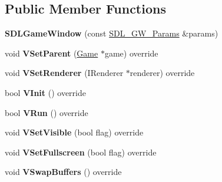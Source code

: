 \subsection*{Public Member Functions}
\begin{DoxyCompactItemize}
\item 
\hypertarget{class_vixen_1_1_s_d_l_game_window_ad7486d1b2cbeb651f5d40557ff50a91f}{}{\bfseries S\+D\+L\+Game\+Window} (const \hyperlink{struct_vixen_1_1_s_d_l___g_w___params}{S\+D\+L\+\_\+\+G\+W\+\_\+\+Params} \&params)\label{class_vixen_1_1_s_d_l_game_window_ad7486d1b2cbeb651f5d40557ff50a91f}

\item 
\hypertarget{class_vixen_1_1_s_d_l_game_window_a0a56bba95b496c6246f2e2950695df8d}{}void {\bfseries V\+Set\+Parent} (\hyperlink{class_vixen_1_1_game}{Game} $\ast$game) override\label{class_vixen_1_1_s_d_l_game_window_a0a56bba95b496c6246f2e2950695df8d}

\item 
\hypertarget{class_vixen_1_1_s_d_l_game_window_aa1a47ffc9ab85dce9f567f734dde10a0}{}void {\bfseries V\+Set\+Renderer} (I\+Renderer $\ast$renderer) override\label{class_vixen_1_1_s_d_l_game_window_aa1a47ffc9ab85dce9f567f734dde10a0}

\item 
\hypertarget{class_vixen_1_1_s_d_l_game_window_aff4c569f31064e4e1cb0f0634681dd1a}{}bool {\bfseries V\+Init} () override\label{class_vixen_1_1_s_d_l_game_window_aff4c569f31064e4e1cb0f0634681dd1a}

\item 
\hypertarget{class_vixen_1_1_s_d_l_game_window_a0adc8266360f013f5f58ae6c192c03f9}{}bool {\bfseries V\+Run} () override\label{class_vixen_1_1_s_d_l_game_window_a0adc8266360f013f5f58ae6c192c03f9}

\item 
\hypertarget{class_vixen_1_1_s_d_l_game_window_a3932e200ac8323584ada2a247cb64717}{}void {\bfseries V\+Set\+Visible} (bool flag) override\label{class_vixen_1_1_s_d_l_game_window_a3932e200ac8323584ada2a247cb64717}

\item 
\hypertarget{class_vixen_1_1_s_d_l_game_window_a40c3c941c17fbb95ca0c283106db8361}{}void {\bfseries V\+Set\+Fullscreen} (bool flag) override\label{class_vixen_1_1_s_d_l_game_window_a40c3c941c17fbb95ca0c283106db8361}

\item 
\hypertarget{class_vixen_1_1_s_d_l_game_window_a072b05ffd09bc119dfe42521d6599180}{}void {\bfseries V\+Swap\+Buffers} () override\label{class_vixen_1_1_s_d_l_game_window_a072b05ffd09bc119dfe42521d6599180}


\end{DoxyCompactItemize}
